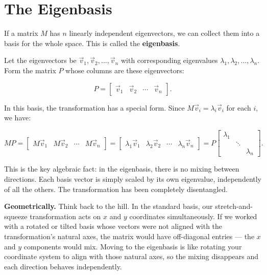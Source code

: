 \documentclass[11pt,openany]{book}
\theoremstyle{definition}
\begin{document}
\section{The Eigenbasis}

If a matrix $M$ has $n$ linearly independent eigenvectors, we can collect them into
a basis for the whole space. This is called the \textbf{eigenbasis}.

\medskip

Let the eigenvectors be $\vec{v}_1, \vec{v}_2, \ldots, \vec{v}_n$ with corresponding
eigenvalues $\lambda_1, \lambda_2, \ldots, \lambda_n$. Form the matrix $P$ whose
columns are these eigenvectors:

\[
P = \begin{bmatrix} \vec{v}_1 & \vec{v}_2 & \cdots & \vec{v}_n \end{bmatrix}.
\]

In this basis, the transformation has a special form. Since $M\vec{v}_i = \lambda_i
\vec{v}_i$ for each $i$, we have:

\[
MP = \begin{bmatrix} M\vec{v}_1 & M\vec{v}_2 & \cdots & M\vec{v}_n \end{bmatrix}
  = \begin{bmatrix} \lambda_1\vec{v}_1 & \lambda_2\vec{v}_2 & \cdots & \lambda_n\vec{v}_n \end{bmatrix}
  = P \begin{bmatrix} \lambda_1 & & \\ & \ddots & \\ & & \lambda_n \end{bmatrix}.
\]

\medskip

This is the key algebraic fact: in the eigenbasis, there is no mixing between
directions. Each basis vector is simply scaled by its own eigenvalue, independently
of all the others. The transformation has been completely disentangled.

\medskip

\textbf{Geometrically.} Think back to the hill. In the standard basis, our
stretch-and-squeeze transformation acts on $x$ and $y$ coordinates simultaneously.
If we worked with a rotated or tilted basis whose vectors were not aligned with the
transformation's natural axes, the matrix would have off-diagonal entries ---
the $x$ and $y$ components would mix. Moving to the eigenbasis is like rotating
your coordinate system to align with those natural axes, so the mixing disappears
and each direction behaves independently.
\end{document}
